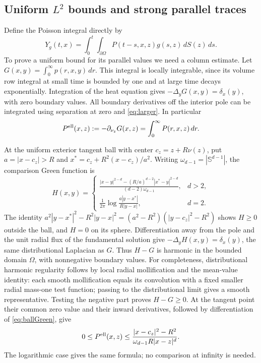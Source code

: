 \documentclass[11pt]{article}
\theoremstyle{remark}
\newcommand{\Om}{\Omega}
\begin{document}
\subsection{Uniform \texorpdfstring{$L^2$}{L2} bounds and strong parallel traces}
Define the Poisson integral directly by
\begin{equation}\label{eq:Poisson}
 Y_g(t,x)=\int_0^t\int_{\partial\Om}P(t-s,x,z)g(s,z)\,dS(z)\,ds.
\end{equation}
To prove a uniform bound for its parallel values we need a column estimate.
Let $G(x,y)=\int_0^\infty p(r,x,y)\,dr$.
This integral is locally integrable, since its volume row integral at small
time is bounded by one and at large time decays exponentially.
Integration of the heat equation gives
$-\Delta_yG(x,y)=\delta_x(y)$, with zero boundary values.
All boundary derivatives off the interior pole can be integrated using
separation at zero and \eqref{eq:larger}. In particular
\[
 P^{\rm ell}(x,z):=-\partial_{\nu_z}G(x,z)
             =\int_0^\infty P(r,x,z)\,dr.
\]

At the uniform exterior tangent ball with center $c_z=z+R\nu(z)$,
put $a=|x-c_z|>R$ and $x^*=c_z+R^2(x-c_z)/a^2$.
Writing $\omega_{d-1}=|\mathbb S^{d-1}|$, the comparison Green function is
\begin{equation}\label{eq:ballGreen}
 H(x,y)=
 \begin{cases}
 \displaystyle\frac{|x-y|^{2-d}-(R/a)^{d-2}|x^*-y|^{2-d}}
                         {(d-2)\omega_{d-1}},&d>2,\\[5pt]
 \displaystyle\frac1{2\pi}\log\frac{a|y-x^*|}{R|y-x|},&d=2 .
 \end{cases}
\end{equation}
The identity
$a^2|y-x^*|^2-R^2|y-x|^2
=(a^2-R^2)(|y-c_z|^2-R^2)$ shows $H\geq0$ outside the ball,
and $H=0$ on its sphere.
Differentiation away from the pole and the unit radial flux of the
fundamental solution give $-\Delta_yH(x,y)=\delta_x(y)$, the same
distributional Laplacian as $G$.
Thus $H-G$ is harmonic in the bounded domain $\Om$, with nonnegative
boundary values.
For completeness, distributional harmonic regularity follows by local
radial mollification and the mean-value identity: each smooth mollification
equals its convolution with a fixed smaller radial mass-one test function;
passing to the distributional limit gives a smooth representative.
Testing the negative part proves $H-G\geq0$.
At the tangent point their common zero value and their inward derivatives,
followed by differentiation of \eqref{eq:ballGreen}, give
\begin{equation}\label{eq:ellbound}
 0\leq P^{\rm ell}(x,z)\leq
          \frac{|x-c_z|^2-R^2}{\omega_{d-1}R|x-z|^d}.
\end{equation}
The logarithmic case gives the same formula; no comparison at infinity
is needed.
\end{document}
